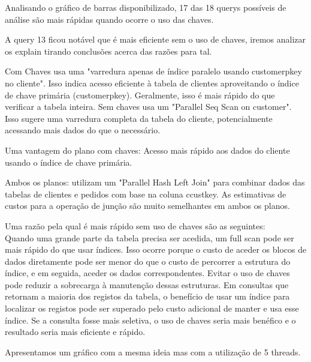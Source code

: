 \documentclass{article}
\begin{document}
Analisando o gráfico de barras disponibilizado, 17 das 18 querys possíveis de análise são mais rápidas quando ocorre o uso das chaves.

A query 13 ficou notável que é mais eficiente sem o uso de chaves, iremos analizar os explain tirando conclusões acerca das razões para tal.

Com Chaves usa uma "varredura apenas de índice paralelo usando customer\underline{}pkey no cliente". Isso indica acesso eficiente à tabela de clientes aproveitando o índice de chave primária (customer\underline{}pkey). Geralmente, isso é mais rápido do que verificar a tabela inteira.
Sem chaves usa um "Parallel Seq Scan on customer". Isso sugere uma varredura completa da tabela do cliente, potencialmente acessando mais dados do que o necessário.

Uma vantagem do plano com chaves: Acesso mais rápido aos dados do cliente usando o índice de chave primária.

Ambos os planos: utilizam um "Parallel Hash Left Join" para combinar dados das tabelas de clientes e pedidos com base na coluna c\underline{}custkey. As estimativas de custos para a operação de junção são muito semelhantes em ambos os planos.

Uma razão pela qual é mais rápido sem uso de chaves são as seguintes:\\
Quando uma grande parte da tabela precisa ser acedida, um full scan pode ser mais rápido do que usar índices. Isso ocorre porque o custo de aceder os blocos de dados diretamente pode ser menor do que o custo de percorrer a estrutura do índice, e em seguida, aceder os dados correspondentes.
Evitar o uso de chaves pode reduzir a sobrecarga à manutenção dessas estruturas. Em consultas que retornam a maioria dos registos da tabela, o benefício de usar um índice para localizar os registos pode ser superado pelo custo adicional de manter e usa esse índice.
Se a consulta fosse mais seletiva, o uso de chaves seria mais benéfico e o resultado seria mais eficiente e rápido.

Apresentamos um gráfico com a mesma ideia mas com a utilização de 5 threads.
\end{document}

